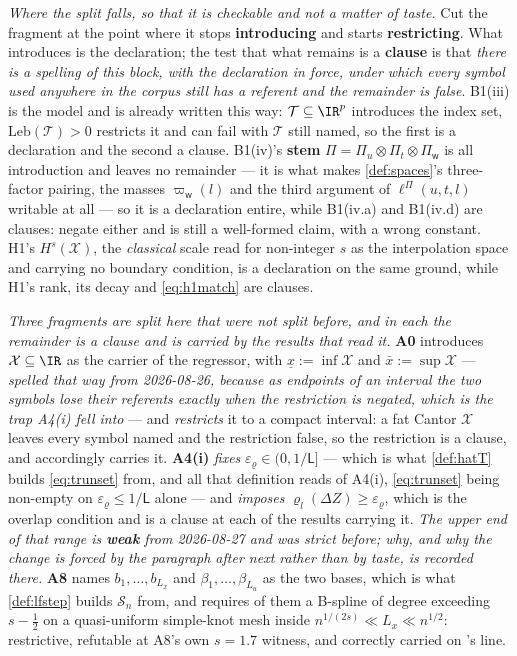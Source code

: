 \emph{Where the split falls, so that it is checkable and not a matter of taste.} Cut the fragment at the
point where it stops \textbf{introducing} and starts \textbf{restricting}. What introduces is the
declaration; the test that what remains is a \textbf{clause} is that \emph{there is a spelling of this
block, with the declaration in force, under which every symbol used anywhere in the corpus still has a
referent and the remainder is false}. B1(iii) is the model and is already written this way:
$\mathcal T\subseteq\IR^{p}$ introduces the index set, $\mathrm{Leb}(\mathcal T)>0$ restricts it and can
fail with $\mathcal T$ still named, so the first is a declaration and the second a clause. B1(iv)'s
\textbf{stem} $\Pi=\Pi_u\otimes\Pi_t\otimes\Pi_{\mathsf w}$ is all introduction and leaves no remainder
--- it is what makes \cref{def:spaces}'s three-factor pairing, the masses $\varpi_{\mathsf w}(l)$ and the
third argument of $\ell^\Pi(u,t,l)$ writable at all --- so it is a declaration entire, while B1(iv.a) and
B1(iv.d) are clauses: negate either and  is still a well-formed claim,
with a wrong constant. H1's $H^{s}(\mathcal X)$, the \emph{classical} scale read for non-integer $s$ as
the interpolation space and carrying no boundary condition, is a declaration on the same ground, while
H1's rank, its decay and \eqref{eq:h1match} are clauses.

\emph{Three fragments are split here that were not split before, and in each the remainder is a clause
and is carried by the results that read it.}
\textbf{A0} introduces $\mathcal X\subseteq\IR$ as the carrier of the regressor, with
$\underline x:=\inf\mathcal X$ and $\bar x:=\sup\mathcal X$ --- \emph{spelled that way from 2026-08-26,
because as endpoints of an interval the two symbols lose their referents exactly when the restriction is
negated, which is the trap A4(i) fell into} --- and \emph{restricts} it to a compact
interval: a fat Cantor $\mathcal X$ leaves every symbol named and the restriction false, so the
restriction is a clause, and  accordingly carries it. \textbf{A4(i)} \emph{fixes}
$\varepsilon_\varrho\in(0,1/\mathsf L]$ --- which is what \cref{def:hatT} builds \eqref{eq:trunset} from,
and all that definition reads of A4(i), \eqref{eq:trunset} being non-empty on
$\varepsilon_\varrho\le1/\mathsf L$ alone --- and \emph{imposes}
$\varrho_l(\Delta Z)\ge\varepsilon_\varrho$, which is the overlap condition and is a clause at each of
the results carrying it. \emph{The upper end of that range is \textbf{weak} from 2026-08-27 and was
strict before; why, and why the change is forced by the paragraph after next rather than by taste, is
recorded there.} \textbf{A8} names
$b_1,\dots,b_{L_x}$ and $\beta_1,\dots,\beta_{L_u}$ as the two bases, which is what \cref{def:lfstep}
builds $\mathcal S_n$ from, and requires of them a B-spline of degree exceeding $s-\tfrac12$ on a
quasi-uniform simple-knot mesh inside $n^{1/(2s)}\ll L_x\ll n^{1/2}$: restrictive, refutable at A8's own
$s=1.7$ witness, and correctly carried on 's line.

